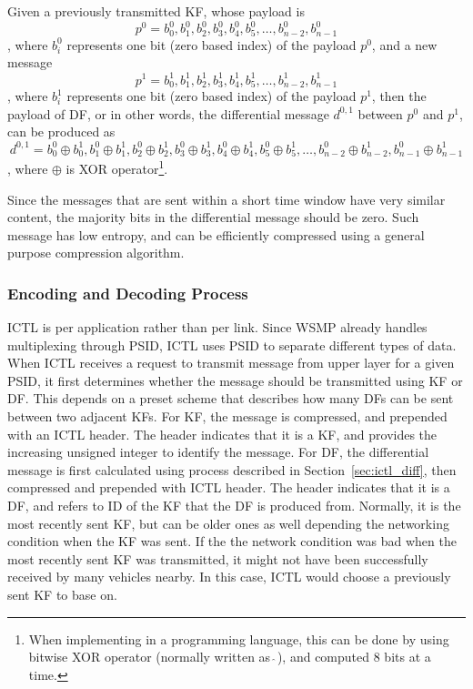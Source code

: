 \documentclass[12pt]{report}
\begin{document}
Given a previously transmitted KF, whose payload is
\begin{equation}
  p^0={b^0_0,b^0_1,b^0_2,b^0_3,b^0_4,b^0_5,\ldots,b^0_{n-2},b^0_{n-1}}
\end{equation}
, where $b^0_i$ represents one bit (zero based index) of the payload $p^0$, and a new message
\begin{equation}
  p^1={b^1_0,b^1_1,b^1_2,b^1_3,b^1_4,b^1_5,\ldots,b^1_{n-2},b^1_{n-1}}
\end{equation}
, where $b^1_i$ represents one bit (zero based index) of the payload $p^1$, then the payload of DF, or in other words, the differential message $d^{0,1}$ between $p^0$ and $p^1$, can be produced as
\begin{equation}
  d^{0,1}={b^0_0\oplus b^1_0,b^0_1\oplus b^1_1,b^0_2\oplus b^1_2,b^0_3\oplus b^1_3,b^0_4\oplus b^1_4,b^0_5\oplus b^1_5,\ldots,b^0_{n-2}\oplus b^1_{n-2},b^0_{n-1}\oplus b^1_{n-1}}
\end{equation}
, where $\oplus $ is XOR operator\footnote{When implementing in a programming language, this can be done by using bitwise XOR operator (normally written as $\hat{\ }$), and computed 8 bits at a time.}.

Since the messages that are sent within a short time window have very similar content, the majority bits in the differential message should be zero. Such message has low entropy, and can be efficiently compressed using a general purpose compression algorithm.

\subsubsection{Encoding and Decoding Process}
\label{sec:ictl_process}

ICTL is per application rather than per link. Since WSMP already handles multiplexing through PSID, ICTL uses PSID to separate different types of data. When ICTL receives a request to transmit message from upper layer for a given PSID, it first determines whether the message should be transmitted using KF or DF. This depends on a preset scheme that describes how many DFs can be sent between two adjacent KFs. For KF, the message is compressed, and prepended with an ICTL header. The header indicates that it is a KF, and provides the increasing unsigned integer to identify the message. For DF, the differential message is first calculated using process described in Section~\ref{sec:ictl_diff}, then compressed and prepended with ICTL header. The header indicates that it is a DF, and refers to ID of the KF that the DF is produced from. Normally, it is the most recently sent KF, but can be older ones as well depending the networking condition when the KF was sent. If the the network condition was bad when the most recently sent KF was transmitted, it might not have been successfully received by many vehicles nearby. In this case, ICTL would choose a previously sent KF to base on.
\end{document}
